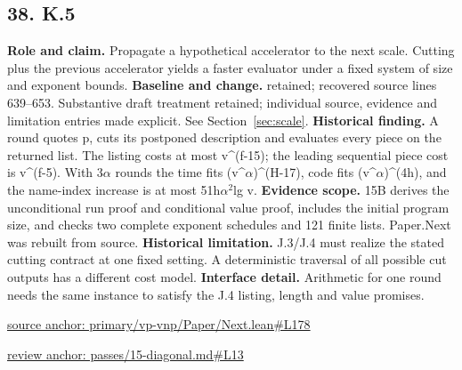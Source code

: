 \documentclass[11pt,letterpaper]{article}
\theoremstyle{definition}\newtheorem{definition}[theorem]{Definition}\newtheorem{example}[theorem]{Example}
\theoremstyle{remark}\newtheorem{remark}[theorem]{Remark}
\begin{document}
\subsection*{38. K.5}
\textbf{Role and claim.} Propagate a hypothetical accelerator to the next scale. Cutting plus the previous accelerator yields a faster evaluator under a fixed system of size and exponent bounds.
\textbf{Baseline and change.} retained; recovered source lines 639--653. Substantive draft treatment retained; individual source, evidence and limitation entries made explicit. See Section~\ref{sec:scale}.
\textbf{Historical finding.} A round quotes p, cuts its postponed description and evaluates every piece on the returned list. The listing costs at most v\textasciicircum{}(f-15); the leading sequential piece cost is v\textasciicircum{}(f-5). With 3\ensuremath{\alpha} rounds the time fits (v\textasciicircum{}\ensuremath{\alpha})\textasciicircum{}(H-17), code fits (v\textasciicircum{}\ensuremath{\alpha})\textasciicircum{}(4h), and the name-index increase is at most 51h\ensuremath{\alpha}\ensuremath{{}^2}lg v.
\textbf{Evidence scope.} 15B derives the unconditional run proof and conditional value proof, includes the initial program size, and checks two complete exponent schedules and 121 finite lists. Paper.Next was rebuilt from source.
\textbf{Historical limitation.} J.3/J.4 must realize the stated cutting contract at one fixed setting. A deterministic traversal of all possible cut outputs has a different cost model.
\textbf{Interface detail.} Arithmetic for one round needs the same instance to satisfy the J.4 listing, length and value promises.
\par\href{https://github.com/nousentllc/VP-VNP-Review/blob/8a7976933b6b2b4ffda1ad3a0dfb5fc6b6f023e8/primary/vp-vnp/Paper/Next.lean\#L178}{source anchor: primary/vp-vnp/Paper/Next.lean\#L178}
\par\href{https://github.com/nousentllc/VP-VNP-Review/blob/8a7976933b6b2b4ffda1ad3a0dfb5fc6b6f023e8/passes/15-diagonal.md\#L13}{review anchor: passes/15-diagonal.md\#L13}
\goodbreak
\end{document}
